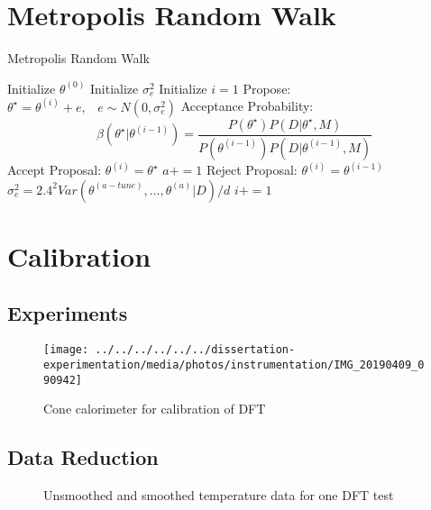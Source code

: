 \documentclass[article]{proc}
\begin{document}
\section{Metropolis Random Walk}

\begin{algorithm}
\caption{Metropolis Random Walk}\label{euclid}
\begin{algorithmic}[1]
\State Initialize $\theta^{(0)}$
\State Initialize $\sigma_e^2$
\State Initialize $i = 1$
    \State Propose: $\theta^{\star} = \theta^{(i)} + e, \hspace{10pt} e \sim N(0, \sigma_e^2)$
    \State Acceptance Probability: $$\beta (\theta^{\star} | \theta^{(i-1)}) = \frac{P(\theta^{\star})P(D|\theta^{\star},M)}{P(\theta^{(i-1)})P(D|\theta^{(i-1)}, M)}$$
            \State Accept Proposal: $\theta^{(i)} = \theta^{\star}$
            \State $a+=1$
        \Else
            \State Reject Proposal: $\theta^{(i)} = \theta^{(i-1)}$
        \EndIf
        \State $\sigma_e^2 = 2.4^2 Var(\theta^{(a-tune)}, \dots, \theta^{(a)}|D)/d$
    \EndWhile
    \State $i+=1$
\EndWhile
\end{algorithmic}
\end{algorithm}

\section{Calibration}

\subsection{Experiments}

\begin{figure}
    \centering
    \texttt{[image: ../../../../../../dissertation-experimentation/media/photos/instrumentation/IMG\_20190409\_090942]}
    \caption{Cone calorimeter for calibration of DFT}
    \label{fig:cone_dft}
\end{figure}

\subsection{Data Reduction}

\begin{figure}[b!]
    \centering
    \qquad
    \caption{Unsmoothed and smoothed temperature data for one DFT test}
    \label{fig:tc_data}
\end{figure}
\end{document}

